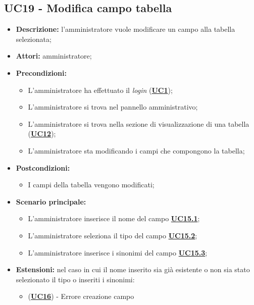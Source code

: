 \subsection{UC19 - Modifica campo tabella}
\label{sec:UC19}
\begin{itemize}
	\item \textbf{Descrizione:} l’amministratore vuole modificare un campo alla tabella selezionata;
	\item \textbf{Attori:} amministratore;
	\item \textbf{Precondizioni:} 
	\begin{itemize}
		\item L’amministratore ha effettuato il \textit{login} (\hyperref[sec:UC1]{\textbf{UC1}});
		\item L’amministratore si trova nel pannello amministrativo;
		\item L’amministratore si trova nella sezione di visualizzazione di una tabella (\hyperref[sec:UC12]{\textbf{UC12}});
		\item L’amministratore sta modificando i campi che compongono la tabella;
	\end{itemize}
	\item \textbf{Postcondizioni:} 
	\begin{itemize}
		\item I campi della tabella vengono modificati;
	\end{itemize}
	\item \textbf{Scenario principale:} 
	\begin{itemize}
		\item L’amministratore inserisce il nome del campo \hyperref[sec:UC15.1]{\textbf{UC15.1}};
		\item L'amministratore seleziona il tipo del campo \hyperref[sec:UC15.2]{\textbf{UC15.2}};
		\item L'amministratore inserisce i sinonimi del campo \hyperref[sec:UC15.3]{\textbf{UC15.3}};
	\end{itemize}

		\item \textbf{Estensioni:} nel caso in cui il nome inserito sia già esistente o non sia stato selezionato il tipo o inseriti i sinonimi:
		\begin{itemize}
			\item (\hyperref[sec:UC16]{\textbf{UC16}}) - Errore creazione campo
	\end{itemize}
\end{itemize}


